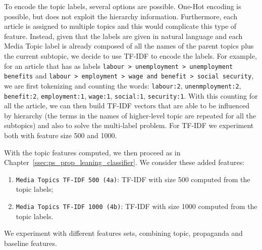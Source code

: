 To encode the topic labels, several options are possible. One-Hot encoding is possible, but does not exploit the hierarchy information. Furthermore, each article is assigned to multiple topics and this would complicate this type of feature. Instead, given that the labels are given in natural language and each Media Topic label is already composed of all the names of the parent topics plus the current subtopic, we decide to use TF-IDF to encode the labels.
For example, for an article that has as labels \texttt{labour > unemployment > unemployment benefits} and \texttt{labour > employment > wage and benefit > social security}, we are first tokenizing and counting the words: \texttt{labour:2}, \texttt{unenmployment:2}, \texttt{benefit:2}, \texttt{employment:1}, \texttt{wage:1}, \texttt{social:1}, \texttt{security:1}. With this counting for all the article, we can then build TF-IDF vectors that are able to be influenced by hierarchy (the terms in the names of higher-level topic are repeated for all the subtopics) and also to solve the multi-label problem.
For TF-IDF we experiment both with feature size 500 and 1000.

With the topic features computed, we then proceed as in Chapter~\ref{ssec:ps_prop_leaning_classifier}. We consider these added features:

\begin{enumerate}
    \item \texttt{Media Topics TF-IDF 500 (4a)}: TF-IDF with size 500 computed from the topic labels;
    \item \texttt{Media Topics TF-IDF 1000 (4b)}: TF-IDF with size 1000 computed from the topic labels.
\end{enumerate}

We experiment with different features sets, combining topic, propaganda and baseline features.

